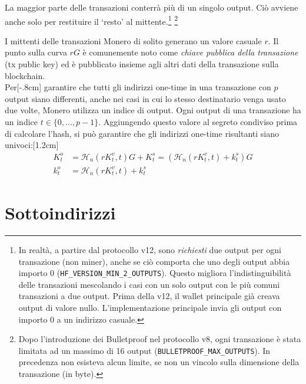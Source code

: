 La maggior parte delle transazioni conterrà più di un singolo output. Ciò avviene anche solo per restituire il `resto' al mittente.\footnote{In realtà, a partire dal protocollo v12, sono {\em richiesti} due output per ogni transazione (non miner), anche se ciò comporta che uno degli output abbia importo 0 ({\tt HF\_VERSION\_MIN\_2\_OUTPUTS}). Questo migliora l'indistinguibilità delle transazioni mescolando i casi con un solo output con le più comuni transazioni a due output. Prima della v12, il wallet principale già creava output di valore nullo. L'implementazione principale invia gli output con importo 0 a un indirizzo casuale.}
\footnote{Dopo l’introduzione dei Bulletproof nel protocollo v8, ogni transazione è stata limitata ad un massimo di 16 output ({\tt BULLETPROOF\_MAX\_OUTPUTS}). In precedenza non esisteva alcun limite, se non un vincolo sulla dimensione della transazione (in byte).} %

I mittenti delle transazioni Monero di solito generano un valore casuale $r$. Il punto sulla curva $r G$ è comunemente noto come {\em chiave pubblica della transazione} (tx public key) ed è pubblicato insieme agli altri dati della transazione sulla blockchain.\\

Per[-.8cm] garantire che tutti gli indirizzi one-time in una transazione con $p$ output siano differenti, anche nei casi in cui lo stesso destinatario venga usato due volte, Monero utilizza un indice di output. Ogni output di una transazione ha un indice $t \in \{0, ..., p-1\}$. Aggiungendo questo valore al segreto condiviso prima di calcolare l’hash, si può garantire che gli indirizzi one-time risultanti siano univoci:[1.2cm]\vspace{.175cm}%
\begin{align*}
  K_t^o &= \mathcal{H}_n(r K_t^v, t)G + K_t^s = (\mathcal{H}_n(r K_t^v, t) + k_t^s)G  \\ 
  k_t^o &= \mathcal{H}_n(r K_t^v, t) + k_t^s
\end{align*}



\section{Sottoindirizzi}
\label{sec:subaddresses}


